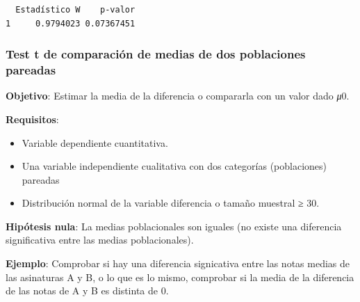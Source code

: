 \documentclass[
  a4paper,
]{scrreport}
\newenvironment{Shaded}{\begin{snugshade}}{\end{snugshade}}
\newcommand{\AttributeTok}[1]{\textcolor[rgb]{0.40,0.45,0.13}{#1}}
\newcommand{\ConstantTok}[1]{\textcolor[rgb]{0.56,0.35,0.01}{#1}}
\newcommand{\FunctionTok}[1]{\textcolor[rgb]{0.28,0.35,0.67}{#1}}
\newcommand{\NormalTok}[1]{\textcolor[rgb]{0.00,0.23,0.31}{#1}}
\newcommand{\OtherTok}[1]{\textcolor[rgb]{0.00,0.23,0.31}{#1}}
\newcommand{\SpecialCharTok}[1]{\textcolor[rgb]{0.37,0.37,0.37}{#1}}
\newcommand{\StringTok}[1]{\textcolor[rgb]{0.13,0.47,0.30}{#1}}
\providecommand{\tightlist}{%
  \setlength{\itemsep}{0pt}\setlength{\parskip}{0pt}}\usepackage{longtable,booktabs,array}
\theoremstyle{definition}
\theoremstyle{definition}
\theoremstyle{remark}
\begin{document}
\begin{Shaded}
\end{Shaded}

\begin{verbatim}
  Estadístico W    p-valor
1     0.9794023 0.07367451
\end{verbatim}

\subsubsection{Test t de comparación de medias de dos poblaciones
pareadas}\label{test-t-de-comparaciuxf3n-de-medias-de-dos-poblaciones-pareadas}

\textbf{Objetivo}: Estimar la media de la diferencia o compararla con un
valor dado \emph{μ}0.

\textbf{Requisitos}:

\begin{itemize}
\tightlist
\item
  Variable dependiente cuantitativa.
\item
  Una variable independiente cualitativa con dos categorías
  (poblaciones) pareadas
\item
  Distribución normal de la variable diferencia o tamaño muestral ≥ 30.
\end{itemize}

\textbf{Hipótesis nula}: La medias poblacionales son iguales (no existe
una diferencia significativa entre las medias poblacionales).

\textbf{Ejemplo}: Comprobar si hay una diferencia signicativa entre las
notas medias de las asinaturas A y B, o lo que es lo mismo, comprobar si
la media de la diferencia de las notas de A y B es distinta de 0.

\begin{Shaded}
\end{Shaded}
\end{document}
